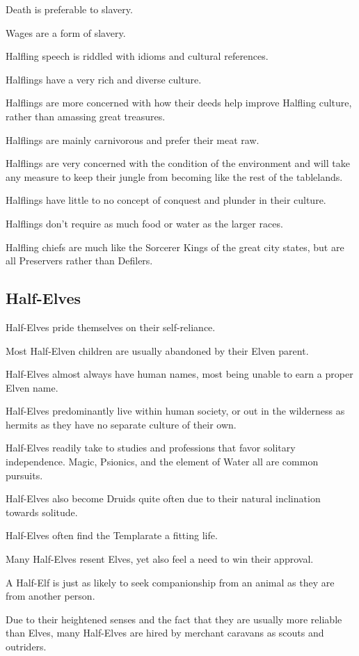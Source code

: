 \begin{multicols}{2}
\begin{description}
    \item Death is preferable to slavery.
    \item Wages are a form of slavery.
    \item Halfling speech is riddled with idioms and cultural references.
    \item Halflings have a very rich and diverse culture.
    \item Halflings are more concerned with how their deeds help improve Halfling culture, rather than amassing great treasures.
    \item Halflings are mainly carnivorous and prefer their meat raw.
    \item Halflings are very concerned with the condition of the environment and will take any measure to keep their jungle from becoming like the rest of the tablelands.
    \item Halflings have little to no concept of conquest and plunder in their culture.
    \item Halflings don’t require as much food or water as the larger races.
    \item Halfling chiefs are much like the Sorcerer Kings of the great city states, but are all Preservers rather than Defilers.
\end{description}

\subsection{Half-Elves}

\begin{description}
    \item Half-Elves pride themselves on their self-reliance.
    \item Most Half-Elven children are usually abandoned by their Elven parent.
    \item Half-Elves almost always have human names, most being unable to earn a proper Elven name.
    \item Half-Elves predominantly live within human society, or out in the wilderness as hermits as they have no separate culture of their own.
    \item Half-Elves readily take to studies and professions that favor solitary independence. Magic, Psionics, and the element of Water all are common pursuits.
    \item Half-Elves also become Druids quite often due to their natural inclination towards solitude.
    \item Half-Elves often find the Templarate a fitting life.
    \item Many Half-Elves resent Elves, yet also feel a need to win their approval.
    \item A Half-Elf is just as likely to seek companionship from an animal as they are from another person.
    \item Due to their heightened senses and the fact that they are usually more reliable than Elves, many Half-Elves are hired by merchant caravans as scouts and outriders.
\end{description}


\end{multicols}

